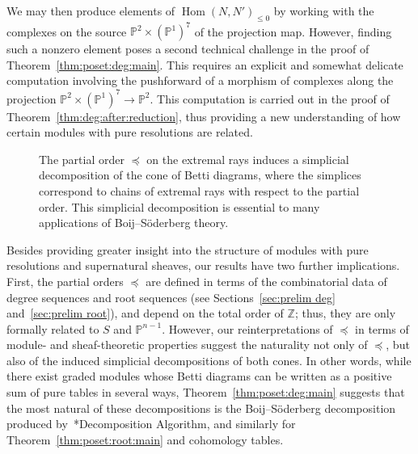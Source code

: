 \documentclass[12pt]{amsart}
\theoremstyle{definition}
\newcommand{\Hom}{\operatorname{Hom}}
\newcommand{\PP}{\mathbb{P}}
\newcommand{\ZZ}{\mathbb{Z}}
\begin{document}
We may then produce elements of $\Hom(N,N')_{\leq 0}$ by working with 
the complexes on the source $\PP^2\times (\PP^1)^7$ of the projection map.  
However, finding such a nonzero element poses a second technical challenge 
in the proof of Theorem~\ref{thm:poset:deg:main}.  This requires an explicit 
and somewhat delicate computation involving the pushforward of a morphism 
of complexes along the projection $\PP^2\times (\PP^1)^7\to \PP^2$. 
This computation is carried out in the proof of 
Theorem~\ref{thm:deg:after:reduction}, thus providing a new understanding 
of how certain modules with pure resolutions are related. 

\begin{figure}
\qquad
{}
\caption{
The partial order $\preceq$ on the extremal rays induces a simplicial
decomposition of the cone of Betti diagrams, where the 
simplices correspond to chains of extremal rays with respect to the partial order.
This simplicial decomposition is essential to many applications of
Boij--S\"oderberg theory.}
\end{figure}

Besides providing greater insight into the structure of modules with pure
resolutions and supernatural sheaves, our results have two further
implications.  First, the partial orders $\preceq$ are defined in
terms of the combinatorial data of degree sequences and root sequences 
(see Sections~\ref{sec:prelim deg} and~\ref{sec:prelim root}), and
depend on the total order of $\ZZ$; thus, they are only formally
related to $S$ and $\PP^{n-1}$.  However, our reinterpretations of 
$\preceq$ in terms of module- and sheaf-theoretic properties 
suggest the naturality not only of $\preceq$, but also of the
induced simplicial decompositions of both cones. In other words,
while there exist graded modules whose Betti diagrams can be written
as a positive sum of pure tables in several ways, Theorem~\ref{thm:poset:deg:main} 
suggests that the most natural of these decompositions is the
Boij--S\"oderberg decomposition produced
by~\cite{EiScConjOfBS07}*{Decomposition Algorithm}, and similarly for
Theorem~\ref{thm:poset:root:main} and cohomology tables.
\end{document}
